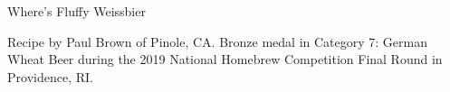 \begin{recipe}{Where's Fluffy Weissbier}

\begin{aboutblock}
Recipe by Paul Brown of Pinole, CA. Bronze medal in Category 7: German Wheat
Beer during the 2019 National Homebrew Competition Final Round in Providence, RI.
\sourceaha
\end{aboutblock}


\begin{methodandtiming}
 
\begin{mashsteps}
\end{mashsteps}

\begin{fermentationsteps}
\end{fermentationsteps}

\end{methodandtiming}

\recipebreak

\begin{ingredientsblock}

\begin{malts}
\end{malts}

\begin{hops}
\end{hops}


\end{ingredientsblock}

\end{recipe}
